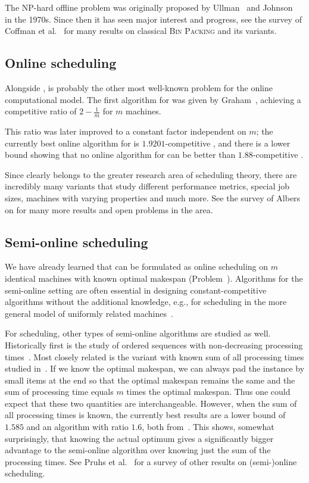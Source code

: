 The NP-hard offline problem \binpacking was originally proposed by
Ullman~\cite{ullman71} and Johnson~\cite{johnson73} in the
1970s. Since then it has seen major interest and progress, see the
survey of Coffman et al.~\cite{coffman13} for many results on
classical \textsc{Bin Packing} and its variants. 

\subsection{Online scheduling}\label{sec:1:schedulinghistory}

Alongside \binpacking, \scheduling is probably the other most
well-known problem for the online computational model. The first
algorithm for \scheduling was given by Graham~\cite{Graham66},
achieving a competitive ratio of $2-\frac{1}{m}$ for $m$ machines.

This ratio was later improved to a constant factor independent on $m$;
the currently best online algorithm for \scheduling is
$1.9201$-competitive \cite{}, and there is a lower bound showing that
no online algorithm for \scheduling can be better than
$1.88$-competitive \cite{}.

Since \scheduling clearly belongs to the greater research area of
scheduling theory, there are incredibly many variants that study
different performance metrics, special job sizes, machines with
varying properties and much more. See the survey of Albers
\cite{alberssurvey} on \scheduling for many more results and open
problems in the area.

\subsection{Semi-online scheduling}

We have already learned that \binstretch can be formulated as online
scheduling on $m$ identical machines with known optimal makespan
(Problem~\label{prb:binstretchscheduling}). Algorithms for the semi-online
setting are often essential in designing constant-competitive
algorithms without the additional knowledge, e.g., for scheduling in
the more general model of uniformly related
machines~\cite{AsAFPW97,BeChKa00,EbJaSg09}.

For scheduling, other types of semi-online algorithms are
studied as well. Historically first is the study of ordered sequences with
non-decreasing processing times~\cite{Graham69}. Most closely related
is the variant with known sum of all processing times studied
in~\cite{KeKoST97}. If we know the optimal makespan, we can always pad
the instance by small items at the end so that the optimal makespan
remains the same and the sum of processing time equals $m$ times the
optimal makespan. Thus one could expect that these two quantities are
interchangeable. However, when the sum of all processing times is
known, the currently best results are a lower bound of $1.585$ and an
algorithm with ratio $1.6$, both
from~\cite{DBLP:journals/tcs/AlbersH12}. This shows, somewhat
surprisingly, that knowing the actual optimum gives a significantly
bigger advantage to the semi-online algorithm over knowing just the
sum of the processing times. See Pruhs et al.~\cite{PST04} for a
survey of other results on (semi-)online scheduling.

